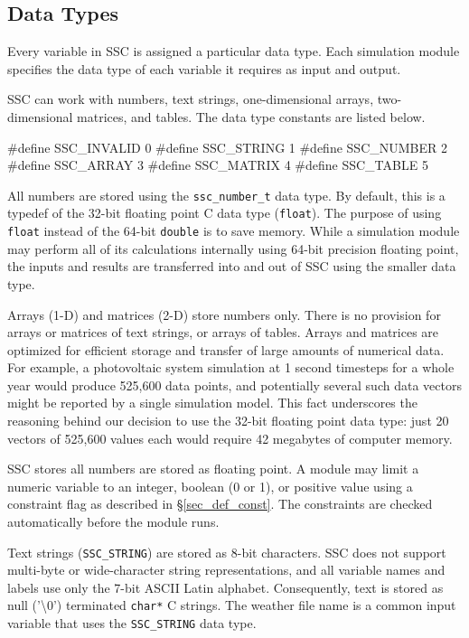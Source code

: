 \documentclass{scrartcl} %
\begin{document}
\subsection{Data Types}

Every variable in SSC is assigned a particular data type. Each simulation module specifies the data type of each variable it requires as input and output.

SSC can work with numbers, text strings, one-dimensional arrays, two-dimensional matrices, and tables. The data type constants are listed below.

\begin{verbatimtab}
#define SSC_INVALID 0
#define SSC_STRING 1
#define SSC_NUMBER 2
#define SSC_ARRAY 3
#define SSC_MATRIX 4
#define SSC_TABLE 5
\end{verbatimtab}

All numbers are stored using the \texttt{ssc\_number\_t} data type.  By default, this is a typedef of the 32-bit floating point C data type (\texttt{float}).  The purpose of using \texttt{float} instead of the 64-bit \texttt{double} is to save memory.  While a simulation module may perform all of its calculations internally using 64-bit precision floating point, the inputs and results are transferred into and out of SSC using the smaller data type.

Arrays (1-D) and matrices (2-D) store numbers only. There is no provision for arrays or matrices of text strings, or arrays of tables.  Arrays and matrices are optimized for efficient storage and transfer of large amounts of numerical data.  For example, a photovoltaic system simulation at 1 second timesteps for a whole year would produce 525,600 data points, and potentially several such data vectors might be reported by a single simulation model.  This fact underscores the reasoning behind our decision to use the 32-bit floating point data type: just 20 vectors of 525,600 values each would require 42 megabytes of computer memory.

SSC stores all numbers are stored as floating point. A module may limit a numeric variable to an integer, boolean (0 or 1), or positive value using a constraint flag as described in \S\ref{sec_def_const}. The constraints are checked automatically before the module runs.

Text strings (\texttt{SSC\_STRING})  are stored as 8-bit characters.  SSC does not support multi-byte or wide-character string representations, and all variable names and labels use only the 7-bit ASCII Latin alphabet.  Consequently, text is stored as null ('\textbackslash 0') terminated \texttt{char*} C strings.  The weather file name is a common input variable that uses the \texttt{SSC\_STRING} data type.
\end{document}
